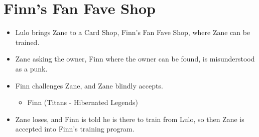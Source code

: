 \section{Finn's Fan Fave Shop}
\begin{itemize}
    \item Lulo brings Zane to a Card Shop, Finn’s Fan Fave Shop, where Zane can be trained.
    \item Zane asking the owner, Finn where the owner can be found, is misunderstood as a punk.
    \item Finn challenges Zane, and Zane blindly accepts. 
    \begin{itemize}
        \item Finn (Titans - Hibernated Legends)    
    \end{itemize}
    \item Zane loses, and Finn is told he is there to train from Lulo, so then Zane is accepted into Finn’s training program.
\end{itemize}
